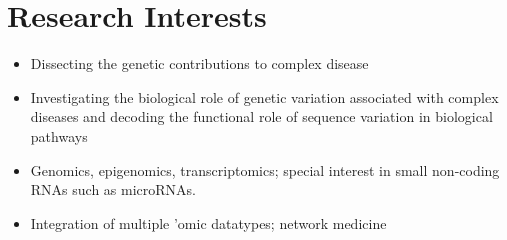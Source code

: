 \documentclass[letterpaper, 10pt]{article}
\newcommand\VRule{\color{lightgray}\vrule width 0.5pt}
\begin{document}

\section*{Research Interests}
\begin{itemize}
   \setlength\itemsep{0em}
   \item Dissecting the genetic contributions to complex disease
   \item Investigating the biological role of genetic variation associated with complex diseases and decoding the functional role of sequence variation in biological pathways
   \item Genomics, epigenomics, transcriptomics; special interest in small non-coding RNAs such as microRNAs.
   \item Integration of multiple 'omic datatypes; network medicine
\end{itemize}

\end{document}
